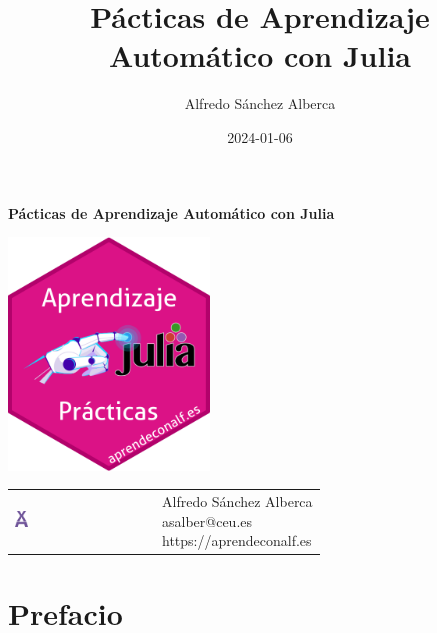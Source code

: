\documentclass[
  a4paper,
]{scrreport}
\title{Pácticas de Aprendizaje Automático con Julia}
\author{Alfredo Sánchez Alberca}
\date{2024-01-06}
\renewcommand*\contentsname{Tabla de contenidos}
\newcommand\contentsname{Tabla de contenidos}
\theoremstyle{definition}
\theoremstyle{remark}
\begin{document}
\begin{titlepage}

\begin{center}
\vspace*{5cm}

\Huge
{\textbf{\textsf{Pácticas de Aprendizaje Automático con Julia}}}

\vspace{0.5cm}
\LARGE
{\textbf{\textsf{}}}

\vspace{1.5cm}

\includegraphics[width=0.4\textwidth]{img/logos/sticker.png}
\end{center}

\vfill

\begin{flushleft}
\begin{tabular}{ll}
\includegraphics[width=0.1\textwidth]{img/logos/aprendeconalf.png} & \parbox[b]{5cm}{\Large\textsf{Alfredo
Sánchez
Alberca}\\ \textsf{asalber@ceu.es} \\ \textsf{https://aprendeconalf.es}}
\end{tabular}
\end{flushleft}
\end{titlepage}
\renewcommand*\contentsname{Tabla de contenidos}
{
\hypersetup{linkcolor=}
\setcounter{tocdepth}{2}
\tableofcontents
}


\chapter*{Prefacio}\label{prefacio}
\end{document}
